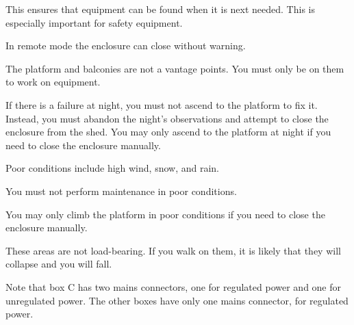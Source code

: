 
This ensures that equipment can be found when it is next needed. This is especially important for safety equipment.


In remote mode the enclosure can close without warning.


The platform and balconies are not a vantage points. You must only be on them to work on equipment.


If there is a failure at night, you must not ascend to the platform to fix it. Instead, you must abandon the night’s observations and attempt to close the enclosure from the shed. You may only ascend to the platform at night if you need to close the enclosure manually.


Poor conditions include high wind, snow, and rain. 

You must not perform maintenance in poor conditions.

You may only climb the platform in poor conditions if you need to close the enclosure manually.


These areas are not load-bearing. If you walk on them, it is likely that they will collapse and you will fall.



Note that box C has two mains connectors, one for regulated power and one for unregulated power. The other boxes have only one mains connector, for regulated power.

